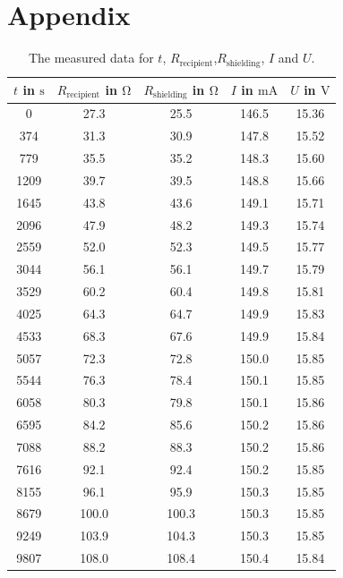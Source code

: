 \section{Appendix}
\label{sec:Anhang}

\begin{table}
    \centering
    \begin{tabular}{c c c c c}
        \toprule
 $t$ in $\si{\s}$ & $R_\text{recipient}$ in $\si{\ohm}$ 
 & $R_\text{shielding}$ in $\si{\ohm}$ & $I$ in $\si{\milli\A}$ &
 $U$ in $\si{\V}$ \\
        \midrule   
0	    & 27.3	& 25.5	 &  146.5	 & 15.36 \\	
374 	& 31.3	& 30.9	 &  147.8	 & 15.52 \\
779 	& 35.5	& 35.2	 &  148.3	 & 15.60 \\
1209	& 39.7	& 39.5	 &  148.8	 & 15.66 \\
1645	& 43.8	& 43.6	 &  149.1	 & 15.71 \\
2096	& 47.9	& 48.2	 &  149.3	 & 15.74 \\
2559	& 52.0	& 52.3	 &  149.5	 & 15.77 \\
3044	& 56.1	& 56.1	 &  149.7	 & 15.79 \\
3529	& 60.2	& 60.4	 &  149.8	 & 15.81 \\
4025	& 64.3	& 64.7	 &  149.9	 & 15.83 \\
4533	& 68.3	& 67.6	 &  149.9	 & 15.84 \\
5057	& 72.3	& 72.8	 &  150.0	 & 15.85 \\
5544	& 76.3	& 78.4	 &  150.1	 & 15.85 \\
6058	& 80.3	& 79.8	 &  150.1	 & 15.86 \\
6595	& 84.2	& 85.6	 &  150.2	 & 15.86 \\
7088	& 88.2	& 88.3	 &  150.2	 & 15.86 \\
7616	& 92.1	& 92.4	 &  150.2	 & 15.85 \\
8155	& 96.1	& 95.9	 &  150.3	 & 15.85 \\
8679	& 100.0	& 100.3	 &  150.3	 & 15.85 \\
9249	& 103.9	& 104.3	 &  150.3	 & 15.85 \\
9807	& 108.0	& 108.4	 &  150.4	 & 15.84 \\
        \bottomrule 
    \end{tabular}
    \caption{The measured data for $t$, $R_\text{recipient}$,$R_\text{shielding}$, $I$ and $U$.}
    \label{tab:Messwerte}
\end{table}

